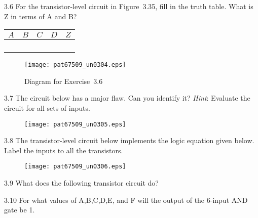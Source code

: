 \documentclass{patt}
\begin{document}
\begin{exercises}
\newpage

\item[3.6] For the transistor-level circuit in Figure~3.35, fill in
  the truth table. What is Z in terms of A and B?

\begin{inlinetable}
\begin{tabular}{@{}ll|lll@{}}\hline
\rule{0pt}{10pt}$A$\rule{0pt}{10pt} & $B$ & $C$ & $D$ & $Z$ \\\hline
\rule{0pt}{10pt}  & & & & \\
 & & & & \\
 & & & & \\
 & & & & \\\hline
\end{tabular}
\end{inlinetable}

\begin{figure}[h]
\centerline{\texttt{[image: pat67509\_un0304.eps]}}
\caption{Diagram for Exercise~3.6}
\label{ex_fig:not}
\vspace{12pt}
\end{figure}

\item[3.7] The circuit below has a major flaw. Can you identify it?
  {\it Hint}: Evaluate the circuit for all sets of inputs.

  \begin{figure}[H]
  \centerline{\texttt{[image: pat67509\_un0305.eps]}}
  \end{figure}

\pagebreak

\item[3.8] The transistor-level circuit below implements the logic
  equation given below. Label the inputs to all the transistors.

  \begin{figure}[H]
  \centerline{\texttt{[image: pat67509\_un0306.eps]}}
  \end{figure}

\item[3.9] What does the following transistor circuit do?

  \begin{figure}[H]
  \end{figure}

\newpage

\item[3.10] For what values of A,B,C,D,E, and F will the output of
  the 6-input AND gate be 1.


\end{exercises}
\end{document}
